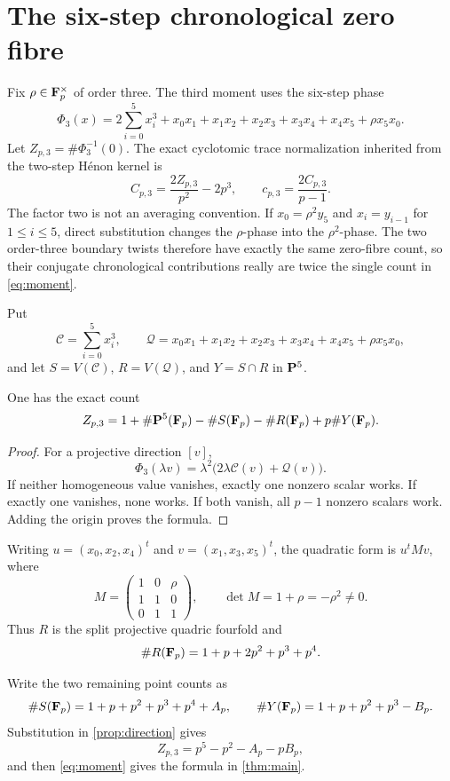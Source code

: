 \section{The six-step chronological zero fibre}

Fix \(\rho\in\mathbf F_p^\times\) of order three.  The third moment uses the six-step
phase
\begin{equation}\label{eq:phase}
 \Phi_3(x)=2\sum_{i=0}^{5}x_i^3+
 x_0x_1+x_1x_2+x_2x_3+x_3x_4+x_4x_5+\rho x_5x_0.
\end{equation}
Let \(Z_{p,3}=\#\Phi_3^{-1}(0)\).  The exact cyclotomic trace normalization
inherited from the two-step H\'enon kernel is
\begin{equation}\label{eq:moment}
 C_{p,3}=\frac{2Z_{p,3}}{p^2}-2p^3,
 \qquad c_{p,3}=\frac{2C_{p,3}}{p-1}.
\end{equation}
The factor two is not an averaging convention.  If
\(x_0=\rho^2y_5\) and \(x_i=y_{i-1}\) for \(1\le i\le5\), direct
substitution changes the \(\rho\)-phase into the \(\rho^2\)-phase.  The two
order-three boundary twists therefore have exactly the same zero-fibre
count, so their conjugate chronological contributions really are twice the
single count in \cref{eq:moment}.

Put
\[
 \mathcal C=\sum_{i=0}^{5}x_i^3,
 \qquad
 \mathcal Q=x_0x_1+x_1x_2+x_2x_3+x_3x_4+x_4x_5+\rho x_5x_0,
\]
and let \(S=V(\mathcal C)\), \(R=V(\mathcal Q)\), and
\(Y=S\cap R\) in \(\mathbf P^5\).

\begin{proposition}\label{prop:direction}
One has the exact count
\[
 Z_{p,3}=1+\#\mathbf P^5(\mathbf F_p)-\#S(\mathbf F_p)-\#R(\mathbf F_p)+p\#Y(\mathbf F_p).
\]
\end{proposition}

\begin{proof}
For a projective direction \([v]\),
\[
 \Phi_3(\lambda v)=\lambda^2
 \bigl(2\lambda\mathcal C(v)+\mathcal Q(v)\bigr).
\]
If neither homogeneous value vanishes, exactly one nonzero scalar works.  If
exactly one vanishes, none works.  If both vanish, all \(p-1\) nonzero
scalars work.  Adding the origin proves the formula.
\end{proof}

Writing \(u=(x_0,x_2,x_4)^t\) and \(v=(x_1,x_3,x_5)^t\), the quadratic form
is \(u^tMv\), where
\[
 M=\begin{pmatrix}1&0&\rho\\1&1&0\\0&1&1\end{pmatrix},
 \qquad \det M=1+\rho=-\rho^2\ne0.
\]
Thus \(R\) is the split projective quadric fourfold and
\begin{equation}\label{eq:qcount}
 \#R(\mathbf F_p)=1+p+2p^2+p^3+p^4.
\end{equation}

Write the two remaining point counts as
\begin{equation}\label{eq:traces}
 \#S(\mathbf F_p)=1+p+p^2+p^3+p^4+A_p,
 \qquad
 \#Y(\mathbf F_p)=1+p+p^2+p^3-B_p.
\end{equation}
Substitution in \cref{prop:direction} gives
\begin{equation}\label{eq:zformula}
 Z_{p,3}=p^5-p^2-A_p-pB_p,
\end{equation}
and then \cref{eq:moment} gives the formula in \cref{thm:main}.
